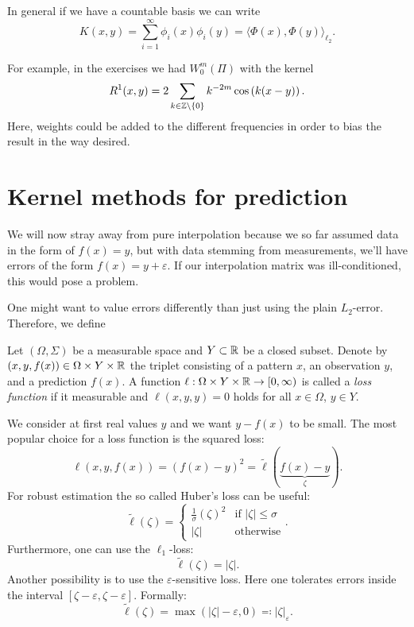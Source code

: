 \documentclass[../lecture-notes.tex]{subfiles}
\begin{document}
In general if we have a countable basis we can write
\[
	K(x, y) = \sum_{i=1}^\infty \phi_i(x) \phi_i(y) = \langle \Phi(x), \Phi(y) \rangle_{\ell_2}.
\]

For example, in the exercises we had $W_0^m(\Pi)$ with the kernel
\[
	R^1(x, y) = 2 \sum_{k \in \mathbb{Z} \setminus \{ 0 \}} k^{-2m} \cos \left( k(x-y) \right).
\]
Here, weights could be added to the different frequencies in order to bias the result in the way desired.

\section{Kernel methods for prediction} %
\label{sec:1.4}
We will now stray away from pure interpolation because we so far assumed data in the form of $f(x) = y$, but with data stemming from measurements, we'll have errors of the form $f(x) = y + \varepsilon$. If our interpolation matrix was ill-conditioned, this would pose a problem.

One might want to value errors differently than just using the plain $L_2$-error. Therefore, we define
\begin{definition} %
\label{thm:38}
Let $(\Omega, \Sigma)$ be a measurable space and $Y \subset \mathbb{R}$ be a closed subset.
Denote by $(x, y, f(x)) \in \Omega \times Y \times \mathbb{R}$ the triplet consisting of a pattern $x$, an observation $y$, and a prediction $f(x)$.
A function $\ell : \Omega \times Y \times \mathbb{R} \to [0, \infty)$ is called a \emph{loss function} if it measurable and $\ell(x, y, y) = 0$ holds for all $x \in \Omega$, $y \in Y$.
\end{definition}
We consider at first real values $y$ and we want $y - f(x)$ to be small.
The most popular choice for a loss function is the squared loss:
\[
	\ell(x, y, f(x)) = \left( f(x) - y \right)^2 = \tilde{\ell}( \underbrace{f(x) - y}_{\zeta} ).
\]
For robust estimation the so called Huber's loss can be useful:
\[
	\tilde{\ell}(\zeta) = \begin{cases}
	\frac{1}{\sigma} (\zeta)^2 & \text{if } |\zeta| \leq \sigma \\
	|\zeta| & \text{otherwise}
	\end{cases}.
\]
Furthermore, one can use the $\ell_1$-loss:
\[
	\tilde{\ell}(\zeta) = |\zeta|.
\]
Another possibility is to use the $\varepsilon$-sensitive loss. Here one tolerates errors inside the interval $[\zeta - \varepsilon, \zeta - \varepsilon]$. Formally:
\[
	\tilde{\ell}(\zeta) = \max \left( |\zeta| - \varepsilon, 0 \right) \eqqcolon |\zeta|_{\varepsilon}.
\]
\end{document}
